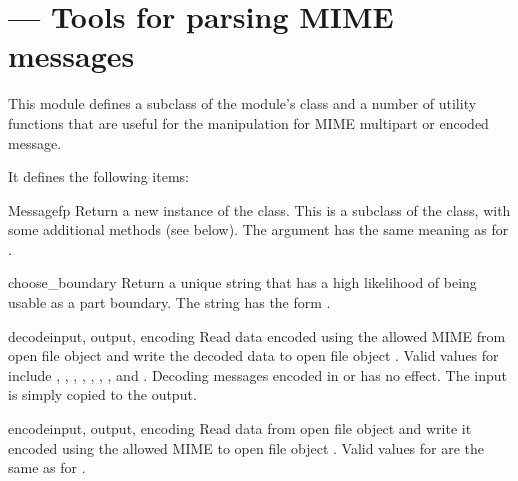 \section{ ---
         Tools for parsing MIME messages}



This module defines a subclass of the
 module's
 class and a number of utility functions that are
useful for the manipulation for MIME multipart or encoded message.

It defines the following items:

\begin{classdesc}{Message}{fp}
Return a new instance of the  class.  This is a
subclass of the  class, with some additional
methods (see below).  The  argument has the same meaning
as for .
\end{classdesc}

\begin{funcdesc}{choose_boundary}{}
Return a unique string that has a high likelihood of being usable as a
part boundary.  The string has the form
.
\end{funcdesc}

\begin{funcdesc}{decode}{input, output, encoding}
Read data encoded using the allowed MIME  from open file
object  and write the decoded data to open file object
.  Valid values for  include
, , ,
, , , , and 
.  Decoding messages encoded in  or 
has no effect.  The input is simply copied to the output.
\end{funcdesc}

\begin{funcdesc}{encode}{input, output, encoding}
Read data from open file object  and write it encoded using
the allowed MIME  to open file object .
Valid values for  are the same as for .
\end{funcdesc}

